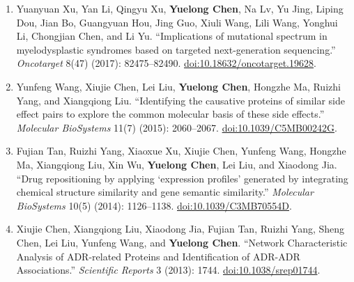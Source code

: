 {\begin{enumerate}[leftmargin=*, label=\arabic*., itemsep=4pt, parsep=0pt, topsep=4pt, before={\interlinepenalty=10000}]
  \item Yuanyuan Xu, Yan Li, Qingyu Xu, \textbf{Yuelong Chen}, Na Lv, Yu Jing, Liping Dou, Jian Bo, Guangyuan Hou, Jing Guo, Xiuli Wang, Lili Wang, Yonghui Li, Chongjian Chen, and Li Yu. ``Implications of mutational spectrum in myelodysplastic syndromes based on targeted next-generation sequencing.'' \textit{Oncotarget} 8(47) (2017): 82475--82490. \href{https://doi.org/10.18632/oncotarget.19628}{doi:10.18632/oncotarget.19628}.

  \item Yunfeng Wang, Xiujie Chen, Lei Liu, \textbf{Yuelong Chen}, Hongzhe Ma, Ruizhi Yang, and Xiangqiong Liu. ``Identifying the causative proteins of similar side effect pairs to explore the common molecular basis of these side effects.'' \textit{Molecular BioSystems} 11(7) (2015): 2060--2067. \href{https://doi.org/10.1039/C5MB00242G}{doi:10.1039/C5MB00242G}.

  \item Fujian Tan, Ruizhi Yang, Xiaoxue Xu, Xiujie Chen, Yunfeng Wang, Hongzhe Ma, Xiangqiong Liu, Xin Wu, \textbf{Yuelong Chen}, Lei Liu, and Xiaodong Jia. ``Drug repositioning by applying `expression profiles' generated by integrating chemical structure similarity and gene semantic similarity.'' \textit{Molecular BioSystems} 10(5) (2014): 1126--1138. \href{https://doi.org/10.1039/C3MB70554D}{doi:10.1039/C3MB70554D}.

  \item Xiujie Chen, Xiangqiong Liu, Xiaodong Jia, Fujian Tan, Ruizhi Yang, Sheng Chen, Lei Liu, Yunfeng Wang, and \textbf{Yuelong Chen}. ``Network Characteristic Analysis of ADR-related Proteins and Identification of ADR-ADR Associations.'' \textit{Scientific Reports} 3 (2013): 1744. \href{https://doi.org/10.1038/srep01744}{doi:10.1038/srep01744}.
\end{enumerate}
}

